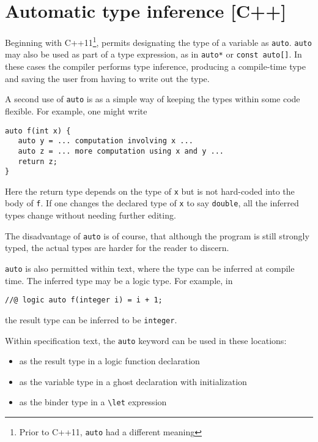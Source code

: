 \section{Automatic type inference [C++]}
\label{sec:auto}

Beginning with C++11\footnote{Prior to C++11, \lstinline|auto| had a different meaning}, \lang permits designating the type of a variable as
\lstinline|auto|.
 \lstinline|auto| may also be used as part of a type expression, as in \lstinline|auto*| or \lstinline|const auto[]|. In these cases the compiler performs type inference, producing a compile-time type and
saving the user from having to write out the type.

A second use of \lstinline|auto| is as a simple way of keeping the types
within some code flexible. For example, one might write
\begin{lstlisting}
auto f(int x) {
   auto y = ... computation involving x ...
   auto z = ... more computation using x and y ...
   return z;
}
\end{lstlisting}
Here the return type depends on the type of \lstinline|x| but is not hard-coded into the body of \lstinline|f|. If one changes the declared type of
\lstinline|x| to say \lstinline|double|, all the inferred types change without needing further editing.

The disadvantage of \lstinline|auto| is of course, that although the 
program is still strongly typed, the actual types are harder for the reader to discern.

\lstinline|auto| is also permitted within \NAME text, where the type can be inferred at compile time. The inferred type may be a logic type. For example, in
\begin{lstlisting}
//@ logic auto f(integer i) = i + 1;
\end{lstlisting}
the result type can be inferred to be \lstinline|integer|.

Within \NAME specification text, the \lstinline|auto| keyword can be used in these locations:
\begin{itemize}
	\item as the result type in a logic function declaration
	\item as the variable type in a ghost declaration with initialization
	\item as the binder type in a \lstinline|\let| expression
\end{itemize}



